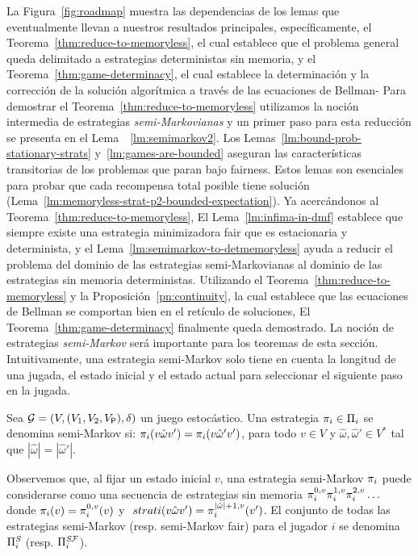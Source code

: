 La Figura~\ref{fig:roadmap} muestra las dependencias de los lemas que eventualmente llevan a nuestros resultados principales, específicamente, el Teorema~\ref{thm:reduce-to-memoryless}, el cual establece que el problema general queda delimitado a estrategias deterministas sin memoria, y el Teorema~\ref{thm:game-determinacy}, el cual establece la determinación y la corrección de la solución algorítmica a través de las ecuaciones de Bellman-
Para demostrar el Teorema~\ref{thm:reduce-to-memoryless} utilizamos la noción intermedia de estrategias \emph{semi-Markovianas} \cite{FilarV96} y un primer paso para esta reducción se presenta en el Lema~~\ref{lm:semimarkov2}.
Los Lemas~\ref{lm:bound-prob-stationary-strats}
y~\ref{lm:games-are-bounded} aseguran las características transitorias de los problemas que paran bajo fairness.  Estos lemas son esenciales para probar que cada recompensa total posible tiene solución
(Lema~\ref{lm:memoryless-strat-p2-bounded-expectation}).  Ya acercándonos al Teorema~\ref{thm:reduce-to-memoryless},
El Lema~\ref{lm:infima-in-dmf} establece que siempre existe una estrategia minimizadora fair que es estacionaria y determinista, y
el Lema~\ref{lm:semimarkov-to-detmemoryless} ayuda a reducir el problema del dominio de las estrategias semi-Markovianas al dominio de las estrategias sin memoria deterministas.  Utilizando el Teorema~\ref{thm:reduce-to-memoryless}
y la Proposición~\ref{pn:continuity}, la cual establece que las ecuaciones de Bellman se comportan bien en el retículo de soluciones,
El Teorema~\ref{thm:game-determinacy} finalmente queda demostrado.
La noción de estrategias \emph{semi-Markov} \cite{FilarV96} será importante para los teoremas de esta sección. Intuitivamente, una estrategia semi-Markov solo tiene en cuenta la longitud de una jugada, el estado inicial y el estado actual para seleccionar el siguiente paso en la jugada.
        
\begin{definition}\label{def:semimarkov:strategy} Sea $\mathcal{G} = (V, (V_1, V_2, V_{\mathsf{P}}), \delta)$ un juego estocástico. Una estrategia $\pi_{i} \in \Pi_{i}$ se denomina semi-Markov si: $\pi_{i}(v \hat{\omega}v') = \pi_{i}(v \hat{\omega}'v')$, para todo $v \in V$ y $\hat{\omega}, \hat{\omega}' \in V^*$ tal que $|\hat{\omega}|=|\hat{\omega}'|$. 
\end{definition}

Observemos que, al fijar un estado inicial $v$, una estrategia semi-Markov $\pi_{i}$ puede considerarse como una secuencia de estrategias sin memoria $\pi_{i}^{0,v}\pi_{i }^{1,v}\pi_{i}^{2,v}\ldots$ donde $\pi_{i}(v)=\pi_{i}^{0,v}(v)$ y $\ strat{i}(v\hat{\omega}v')=\strat{i}^{|\hat{\omega}|+1,v}(v')$. El conjunto de todas las estrategias semi-Markov (resp. semi-Markov fair) para el jugador $i$ se denomina $\Pi^{\textit{S}}_{i}$ (resp. $\Pi^{\textit{S}\mathcal{F}}_{i}$).

